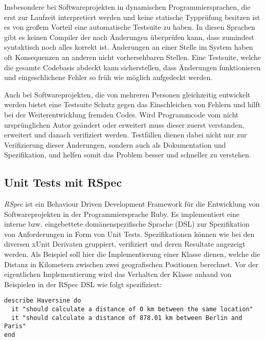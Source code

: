 Insbesondere bei Softwareprojekten in dynamischen Programmiersprachen,
die erst zur Laufzeit interpretiert werden und keine statische
Typprüfung besitzen ist es von großem Vorteil eine automatische
Testsuite zu haben. In diesen Sprachen gibt es keinen Compiler der
nach Änderungen überprüfen kann, dass zumindest syntaktisch noch alles
korrekt ist. Änderungen an einer Stelle im System haben oft
Konsequenzen an anderen nicht vorhersehbaren Stellen. Eine Testsuite,
welche die gesamte Codebasis abdeckt kann sicherstellen, dass
Änderungen funktionieren und eingeschlichene Fehler so früh wie
möglich aufgedeckt werden.

Auch bei Softwareprojekten, die von mehreren Personen gleichzeitig
entwickelt werden bietet eine Testsuite Schutz gegen das Einschleichen
von Fehlern und hilft bei der Weiterentwicklung fremden Codes. Wird
Programmcode vom nicht ursprünglichen Autor geändert oder erweitert
muss dieser zuerst verstanden, erweitert und danach verifiziert
werden. Testfällen dienen dabei nicht nur zur Verifizierung dieser
Änderungen, sondern auch als Dokumentation und Spezifikation, und
helfen somit das Problem besser und schneller zu verstehen.

\subsection{Unit Tests mit RSpec}

\textit{RSpec} \cite{rspec} ist ein Behaviour Driven Development
Framework für die Entwicklung von Softwareprojekten in der
Programmiersprache Ruby.  Es implementiert eine interne
bzw. eingebettete domänen\-spezifische Sprache (DSL) zur Spezifikation
von Anforderungen in Form von Unit Tests.  Spezifikationen können wie
bei den diversen xUnit Derivaten gruppiert, verifiziert und deren
Resultate angezeigt werden. Als Beispiel soll hier die Implementierung
einer Klasse dienen, welche die Distanz in Kilometern zwischen zwei
geografischen Positionen berechnet. Vor der eigentlichen
Implementierung wird das Verhalten der Klasse anhand von Beispielen in
der RSpec DSL wie folgt spezifiziert:

\begin{lstlisting}
describe Haversine do
  it "should calculate a distance of 0 km between the same location"
  it "should calculate a distance of 878.01 km between Berlin and Paris"
end
\end{lstlisting}

